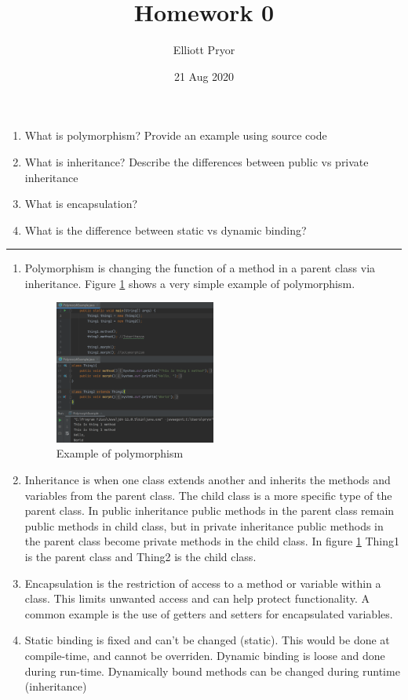 \documentclass[11pt]{article}
\title{Homework 0}
\author{Elliott Pryor}
\date{21 Aug 2020}
\begin{document}
\maketitle

\begin{enumerate}[1.]
	\item What is polymorphism? Provide an example using source code
	\item What is inheritance? Describe the differences between public vs private inheritance
	\item What is encapsulation?
	\item What is the difference between static vs dynamic binding?
\end{enumerate}
\hrule

\begin{enumerate}[1.]
	\item Polymorphism is changing the function of a method in a parent class via inheritance. Figure \ref{fig:polymorph} shows a very simple example of polymorphism.	
	
	\begin{figure}[H]
	    \centering
	    \includegraphics[width=0.5\textwidth]{../pictures/polymorph.png}
	    \caption{Example of polymorphism}
	    \label{fig:polymorph}
	\end{figure}
	
	\item Inheritance is when one class extends another and inherits the methods and variables from the parent class. The child class is a more specific type of the parent class. In public inheritance public methods in the parent class remain public methods in child class, but in private inheritance public methods in the parent class become private methods in the child class. In figure \ref{fig:polymorph} Thing1 is the parent class and Thing2 is the child class.
	\item Encapsulation is the restriction of access to a method or variable within a class. This limits unwanted access and can help protect functionality. A common example is the use of getters and setters for encapsulated variables. 
	\item Static binding is fixed and can't be changed (static). This would be done at compile-time, and cannot be overriden. Dynamic binding is loose and done during run-time. Dynamically bound methods can be changed during runtime (inheritance) \cite{singh_2013}
\end{enumerate}
\end{document}

